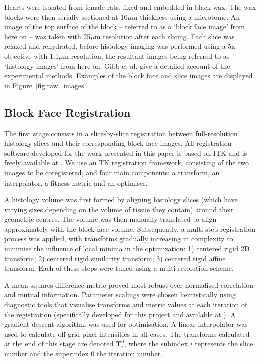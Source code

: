     Hearts were isolated from female rats, fixed and embedded in black wax. The wax blocks were then serially sectioned at 10$\mu$m thickness using a microtome. An image of the top surface of the block -- referred to as a `block face image' from here on -- was taken with 25$\mu$m resolution after each slicing. Each slice was relaxed and rehydrated, before histology imaging was performed using a 5x objective with 1.1$\mu$m resolution, the resultant images being referred to as `histology images' from here on. Gibb et al. \cite{Gibb2012} give a detailed account of the experimental methods. Examples of the block face and slice images are displayed in Figure~\ref{fig:raw_images}.
  
  \subsection{Block Face Registration} %
  \label{sub:block_face_registration}
    The first stage consists in a slice-by-slice registration between full-resolution histology slices and their corresponding block-face images. All registration software developed for the work presented in this paper is based on ITK \cite{Yoo2002} and is freely available at \cite{github_registration}. We use an TK registration framework, consisting of the two images to be coregistered, and four main components: a transform, an interpolator, a fitness metric and an optimiser.
    
    A histology volume was first formed by aligning histology slices (which have varying sizes depending on the volume of tissue they contain) around their geometric centres. The volume was then manually translated to align approximately with the block-face volume. Subsequently, a multi-step registration process was applied, with transforms gradually increasing in complexity to minimise the influence of local minima in the optimization: 1) centered rigid 2D transform; 2) centered rigid similarity transform; 3) centered rigid affine transform. Each of these steps were tuned using a multi-resolution scheme. 
    
A mean squares difference metric proved most robust over normalised correlation and mutual information. Parameter scalings were chosen heuristically using diagnostic tools that visualise transforms and metric values at each iteration of the registration (specifically developed for this project and available at \cite{github_registration}). A gradient descent algorithm was used for optimisation. A linear interpolator was used to calculate off-grid pixel intensities in all cases. The transforms calculated at the end of this stage are denoted $\mathbf{T}_{i}^{0}$, where the subindex ${i}$ represents the slice number and the superindex ${0}$ the iteration number.
  
